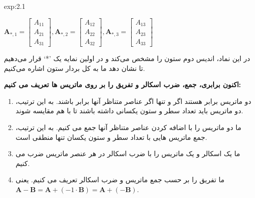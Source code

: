{\begin{spacing}{1.5}
\begin{example}{exp:2.1}
            \begin{center}
                $\textbf{A}_{*,1}=\begin{bmatrix}
                                      A_{11} \\
                                      A_{21} \\
                                      A_{31}
                \end{bmatrix},
                \textbf{A}_{*,2}=\begin{bmatrix}
                                     A_{12} \\
                                     A_{22} \\
                                     A_{32}
                \end{bmatrix},
                \textbf{A}_{*,3}=\begin{bmatrix}
                                     A_{13} \\
                                     A_{23} \\
                                     A_{33}
                \end{bmatrix}$
            \end{center}

            در این نماد، اندیس دوم ستون را مشخص می‌کند و در اولین نمایه یک ’*‘ قرار می‌دهیم تا نشان دهد ما به کل بردار ستون اشاره می‌کنیم.

            \textbf{اکنون برابری، جمع، ضرب اسکالر و تفریق را بر روی ماتریس ها تعریف می کنیم:}

            \begin{enumerate}[label=\textbf{\arabic*}.]
                \item {دو ماتریس برابر هستند اگر و تنها اگر عناصر متناظر آنها برابر باشند.
                به این ترتیب، دو ماتریس باید تعداد سطر و ستون یکسانی داشته باشند تا با هم مقایسه شوند.}
                \item {ما دو ماتریس را با اضافه کردن عناصر متناظر آنها جمع می کنیم.
                به این ترتیب، جمع ماتریس هایی با تعداد سطر و ستون یکسان تنها منطقی است.}
                \item {ما یک اسکالر و یک ماتریس را با ضرب اسکالر در هر عنصر ماتریس ضرب می کنیم.}
                \item {ما تفریق را بر حسب جمع ماتریس و ضرب اسکالر تعریف می کنیم. یعنی \\ $\textbf{A}-\textbf{B}=\textbf{A}+(-1\cdot\textbf{B})=\textbf{A}+(-\textbf{B})$.}
            \end{enumerate}
        \end{example}


\end{spacing}}
